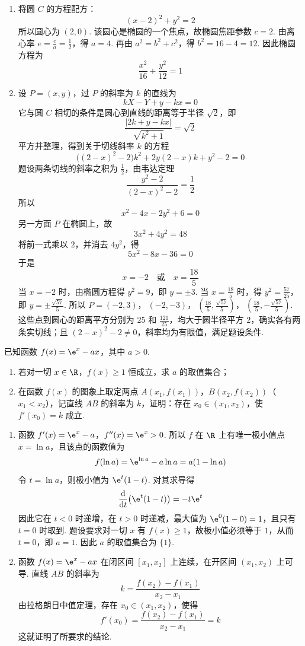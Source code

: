 \begin{solution}
\begin{enumerate}
\item 将圆 \(C\) 的方程配方：
\[
(x-2)^2+y^2=2
\]
所以圆心为 \((2,0)\). 该圆心是椭圆的一个焦点，故椭圆焦距参数
\(c=2\). 由离心率 \(e=\frac ca=\frac12\)，得 \(a=4\). 再由
\(a^2=b^2+c^2\)，得 \(b^2=16-4=12\). 因此椭圆方程为
\[
\frac{x^2}{16}+\frac{y^2}{12}=1
\]
\item 设 \(P=(x,y)\)，过 \(P\) 的斜率为 \(k\) 的直线为
\[
kX-Y+y-kx=0
\]
它与圆 \(C\) 相切的条件是圆心到直线的距离等于半径 \(\sqrt2\)，即
\[
\frac{\left|2k+y-kx\right|}{\sqrt{k^2+1}}=\sqrt2
\]
平方并整理，得到关于切线斜率 \(k\) 的方程
\[
\bigl((2-x)^2-2\bigr)k^2+2y(2-x)k+y^2-2=0
\]
题设两条切线的斜率之积为 \(\frac12\)，由韦达定理
\[
\frac{y^2-2}{(2-x)^2-2}=\frac12
\]
所以
\[
x^2-4x-2y^2+6=0
\]
另一方面 \(P\) 在椭圆上，故
\[
3x^2+4y^2=48
\]
将前一式乘以 \(2\)，并消去 \(4y^2\)，得
\[
5x^2-8x-36=0
\]
于是
\[
x=-2\quad\text{或}\quad x=\frac{18}{5}
\]
当 \(x=-2\) 时，由椭圆方程得 \(y^2=9\)，即 \(y=\pm3\). 当
\(x=\frac{18}{5}\) 时，得 \(y^2=\frac{57}{25}\)，即
\(y=\pm\frac{\sqrt{57}}5\). 所以
\(P=(-2,3)\)，\(\ (-2,-3)\)，\(\ \left(\frac{18}{5},\frac{\sqrt{57}}5\right)\)，\(\ \left(\frac{18}{5},-\frac{\sqrt{57}}5\right)\).
这些点到圆心的距离平方分别为 \(25\) 和 \(\frac{121}{25}\)，均大于圆半径平方 \(2\)，确实各有两条实切线；且 \((2-x)^2-2\neq0\)，斜率均为有限值，满足题设条件.
\end{enumerate}
\end{solution}

\begin{problem}
已知函数 \( f(x) = \e^{x} - ax \)，其中 \( a > 0 \).
\begin{enumerate}
\item 若对一切 \(x \in \R\)，\(f(x) \geqslant 1\) 恒成立，求 \(a\) 的取值集合；
\item 在函数 \(f(x)\) 的图象上取定两点 \(A(x_{1}, f(x_{1}))\)，\(B(x_{2}, f(x_{2}))\)（\(x_{1} < x_{2}\)），记直线 \(AB\) 的斜率为 \(k\)，证明：存在 \(x_{0} \in (x_{1}, x_{2})\)，使 \(f'(x_{0}) = k\) 成立.
\end{enumerate}

\end{problem}

\begin{solution}
\begin{enumerate}
\item 函数
\(f'(x)=\e^x-a\)，\(f''(x)=\e^x>0\).
所以 \(f\) 在 \(\R\) 上有唯一极小值点
\(x=\ln a\)，且该点的函数值为
\[
f(\ln a)=\e^{\ln a}-a\ln a=a(1-\ln a)
\]
令 \(t=\ln a\)，则极小值为 \(\e^t(1-t)\). 对其求导得
\[
\frac{\mathrm d}{\mathrm dt}\bigl(\e^t(1-t)\bigr)=-t\e^t
\]
因此它在 \(t<0\) 时递增，在 \(t>0\) 时递减，最大值为
\(\e^0(1-0)=1\)，且只有 \(t=0\) 时取到. 题设要求对一切
\(x\) 有 \(f(x)\geqslant1\)，故极小值必须等于 \(1\)，从而
\(t=0\)，即 \(a=1\). 因此 \(a\) 的取值集合为 \(\{1\}\).
\item 函数 \(f(x)=\e^x-ax\) 在闭区间 \([x_1,x_2]\) 上连续，在开区间
\((x_1,x_2)\) 上可导. 直线 \(AB\) 的斜率为
\[
k=\frac{f(x_2)-f(x_1)}{x_2-x_1}
\]
由拉格朗日中值定理，存在 \(x_0\in(x_1,x_2)\)，使得
\[
f'(x_0)=\frac{f(x_2)-f(x_1)}{x_2-x_1}=k
\]
这就证明了所要求的结论.
\end{enumerate}
\end{solution}
